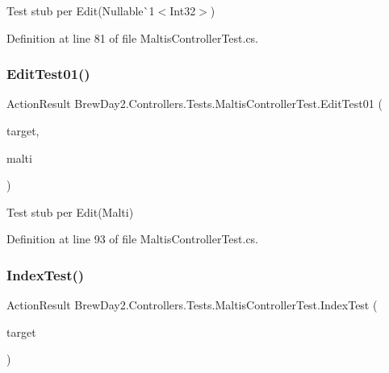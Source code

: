 Test stub per Edit(Nullable\`{}1$<$Int32$>$)



Definition at line 81 of file Maltis\+Controller\+Test.\+cs.

\mbox{\label{class_brew_day2_1_1_controllers_1_1_tests_1_1_maltis_controller_test_a351bcdc1cd26b01047cd9a2de6eec49e}} 
\subsubsection{\texorpdfstring{Edit\+Test01()}{EditTest01()}}
{\footnotesize\ttfamily Action\+Result Brew\+Day2.\+Controllers.\+Tests.\+Maltis\+Controller\+Test.\+Edit\+Test01 (\begin{DoxyParamCaption}\item[{\mbox{[}\+Pex\+Assume\+Under\+Test\mbox{]} \mbox{\hyperlink{class_brew_day2_1_1_controllers_1_1_maltis_controller}{Maltis\+Controller}}}]{target,  }\item[{\mbox{\hyperlink{class_brew_day2_1_1_models_1_1_malti}{Malti}}}]{malti }\end{DoxyParamCaption})}



Test stub per Edit(\+Malti)



Definition at line 93 of file Maltis\+Controller\+Test.\+cs.

\mbox{\label{class_brew_day2_1_1_controllers_1_1_tests_1_1_maltis_controller_test_ad741e97be58668a8244776ae96ca6105}} 
\subsubsection{\texorpdfstring{Index\+Test()}{IndexTest()}}
{\footnotesize\ttfamily Action\+Result Brew\+Day2.\+Controllers.\+Tests.\+Maltis\+Controller\+Test.\+Index\+Test (\begin{DoxyParamCaption}\item[{\mbox{[}\+Pex\+Assume\+Under\+Test\mbox{]} \mbox{\hyperlink{class_brew_day2_1_1_controllers_1_1_maltis_controller}{Maltis\+Controller}}}]{target }\end{DoxyParamCaption})}



